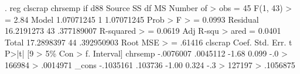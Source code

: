 . reg clscrap chrsemp if d88
{\smallskip}
      Source {\VBAR}       SS           df       MS      Number of
>  obs   =        45
   F(1, 43) 
>        =      2.84
       Model {\VBAR}  1.07071245         1  1.07071245   Prob > F 
>        =    0.0993
    Residual {\VBAR}  16.2191273        43  .377189007   R-squared
>        =    0.0619
   Adj R-squ
> ared   =    0.0401
       Total {\VBAR}  17.2898397        44  .392950903   Root MSE 
>        =    .61416
{\smallskip}
     clscrap {\VBAR}      Coef.   Std. Err.      t    P>|t|     [9
> 5\% Con                                                    
>       f. Interval]
     chrsemp {\VBAR}  -.0076007   .0045112    -1.68   0.099    -.0
> 166984                                                    
>           .0014971
       _cons {\VBAR}  -.1035161    .103736    -1.00   0.324    -.3
> 127197                                                    
>           .1056875
{\smallskip}
